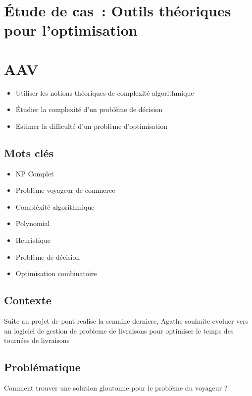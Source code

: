 \newpage
\section*{Étude de cas~: Outils théoriques \\ pour l'optimisation}

\section*{AAV}
\begin{itemize}
	\item [3] Utiliser les notions théoriques de complexité algorithmique
	\item [3] Étudier la complexité d’un problème de décision
	\item [2] Estimer la difficulté d’un problème d’optimisation
\end{itemize}

\newpage

\subsection*{Mots clés}
{}
\begin{itemize}
	\item NP Complet
	\item Problème voyageur de commerce
	\item Compléxité algorithmique
	\item Polynomial
	\item Heuristique
	\item Problème de décision
	\item Optimisation combinatoire
\end{itemize}

\subsection*{Contexte}
{}
\noindent Suite au projet de pont realise la semaine derniere, Agathe souhaite evoluer vers un logiciel de gestion de probleme de livraisons pour optimiser le temps des tournées de livraisons

\subsection*{Problématique}
{}
\noindent Comment trouver une solution gloutonne pour le problème du voyageur ?

